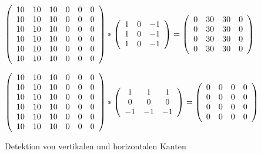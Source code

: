 \begin{figure}
$$
\left(
\begin{array}{ccc ccc}
    10 & 10 & 10 & 0 & 0 & 0 \\
    10 & 10 & 10 & 0 & 0 & 0 \\
    10 & 10 & 10 & 0 & 0 & 0 \\
    10 & 10 & 10 & 0 & 0 & 0 \\
    10 & 10 & 10 & 0 & 0 & 0 \\
    10 & 10 & 10 & 0 & 0 & 0 \\
\end{array}
\right)
\ast
\left(
\begin{array}{ccc}
    1 & 0 & -1 \\
    1 & 0 & -1 \\
    1 & 0 & -1 \\
\end{array}
\right)
=
\left(
\begin{array}{cccc}
    0 & 30 & 30 & 0 \\
    0 & 30 & 30 & 0 \\
    0 & 30 & 30 & 0 \\
    0 & 30 & 30 & 0 \\
\end{array}
\right)
$$

$$
\left(
\begin{array}{ccc ccc}
    10 & 10 & 10 & 0 & 0 & 0 \\
    10 & 10 & 10 & 0 & 0 & 0 \\
    10 & 10 & 10 & 0 & 0 & 0 \\
    10 & 10 & 10 & 0 & 0 & 0 \\
    10 & 10 & 10 & 0 & 0 & 0 \\
    10 & 10 & 10 & 0 & 0 & 0 \\
\end{array}
\right)
\ast
\left(
\begin{array}{ccc}
    1 &  1 &  1 \\
    0 &  0 &  0 \\
    -1 & -1 & -1 \\
\end{array}
\right)
=
\left(
\begin{array}{cccc}
    0 & 0 & 0 & 0 \\
    0 & 0 & 0 & 0 \\
    0 & 0 & 0 & 0 \\
    0 & 0 & 0 & 0 \\
\end{array}
\right)
$$
  \caption{Detektion von vertikalen und horizontalen Kanten}
\end{figure}

